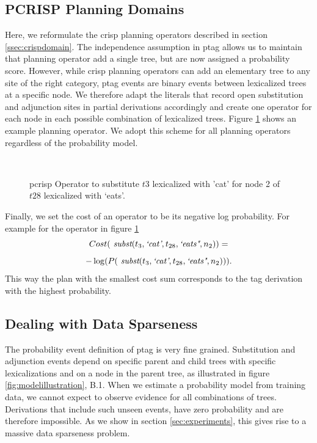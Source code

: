 \subsection{PCRISP Planning Domains}
\label{ssec:pcrisp-domains}
Here, we reformulate the {\sc crisp} planning operators described in section \ref{ssec:crispdomain}.
The independence assumption in {\sc ptag} allows us to maintain that planning operator add a single tree, but are now assigned a probability score. However, while {\sc crisp} planning operators can add an elementary tree to any site of the right category, {\sc ptag} events are binary events between lexicalized trees at a specific node. We therefore adapt the literals that record open substitution and adjunction sites in partial derivations accordingly and create one operator for each node in each possible combination of lexicalized trees.
Figure \ref{example-action} shows an example planning operator. We adopt this scheme for all planning operators regardless of the probability model.
\begin{figure}[t]
\begin{center}
\\\smallskip
\caption{\label{example-action} {\sc pcrisp} Operator to substitute $t3$ lexicalized with 'cat' for node 2 of $t28$ lexicalized with `eats'.}
\end{center}
\end{figure}


Finally, we set the cost of an operator to be its negative log probability. For example for the operator in figure \ref{example-action} $$Cost( \textit{ subst}(t_3,\textit{`cat'},t_{28},\textit{`eats"},n_2) ) =$$
$$ -\log( P(\textit{ subst}(t_3,\textit{`cat'},t_{28},\textit{`eats"},n_2)) ). $$ This way the plan with the smallest cost sum corresponds to the {\sc tag} derivation with the highest probability. 

\subsection{Dealing with Data Sparseness}
\label{ssec:sparseness}
The probability event definition of {\sc ptag} is very fine grained. Substitution and adjunction events depend on specific parent and child trees with specific lexicalizations and on a node in the parent tree, as illustrated in figure \ref{fig:modelillustration}, B.1. When we estimate a probability model from training data, we cannot expect to observe evidence for all combinations of trees. Derivations that include such unseen events, have zero probability and are therefore impossible. As we show in section \ref{sec:experiments}, this gives rise to a massive data sparseness problem.


